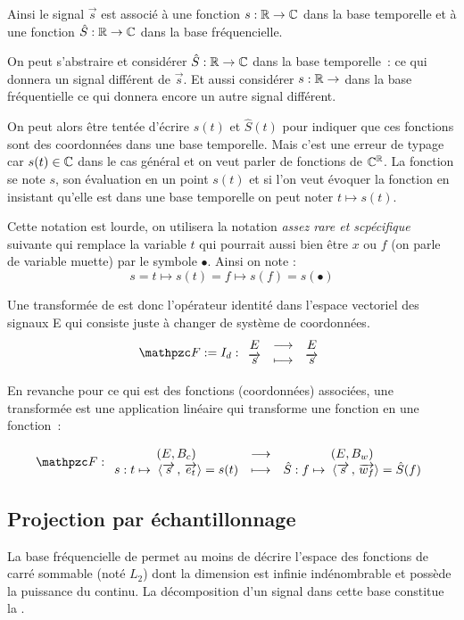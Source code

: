 Ainsi le signal $\vec{s}$ est associé à une fonction $s:\mathbb{R}\to\mathbb{C}$ dans
la base temporelle et à une fonction $\hat{S}:\mathbb{R}\to\mathbb{C}$ dans la base
fréquencielle. 

On peut s'abstraire et considérer $\hat{S}:\mathbb{R}\to\mathbb{C}$ dans la base
temporelle~: ce qui donnera un signal différent de $\vec{s}$. Et aussi
considérer $s:\mathbb{R}\to$ dans la base fréquentielle ce qui donnera encore
un autre signal différent.

\begin{remarque}
  On peut alors être tentée d'écrire $s(t)$ et $\hat{S}(t)$ pour
  indiquer que ces fonctions sont des coordonnées dans une base
  temporelle. Mais c'est une erreur de typage car $s(t)\in\mathbb{C}$ dans le
  cas général et on veut parler de fonctions de $\mathbb{C}^{\mathbb{R}}$. La fonction
  se note $s$, son évaluation en un point $s(t)$ et si l'on veut
  évoquer la fonction en insistant qu'elle est dans une base
  temporelle on peut noter $t\mapsto s(t)$.

  Cette notation est lourde, on utilisera la notation \emph{assez rare
    et scpécifique} suivante qui remplace la variable $t$ qui pourrait
  aussi bien être $x$ ou $f$ (on parle de variable muette) par le
  symbole $\bullet$. Ainsi on note :
  $$ s = t\mapsto s(t) = f \mapsto s(f) = s(\bullet)$$
\end{remarque}


Une transformée de \Fourier{} est donc l'opérateur identité dans
l'espace vectoriel des signaux E qui consiste juste à changer de
système de coordonnées.
$$\F := I_d :  \application{E}{E}{\vec{s}}{\vec{s}}
$$

En revanche pour ce qui est des fonctions
(coordonnées) associées, une transformée est une application linéaire
qui transforme une fonction en une fonction~:

$$\F : \application{(E,B_c)}{(E,B_w)}{s : t\mapsto \;\scal{\vec{s}}{\vec{e_t}}=s(t)}{\hat{S} : f \mapsto \; \scal{\vec{s}}{\vec{w_f}}=\hat{S}(f)}
$$

\subsection{Projection par échantillonnage}

La base fréquencielle de \Fourier{} permet au moins de décrire
l'espace des fonctions de carré sommable (noté $L_2$) dont la
dimension est infinie indénombrable et possède la puissance du
continu. La décomposition d'un signal dans cette base constitue la
\TF.

